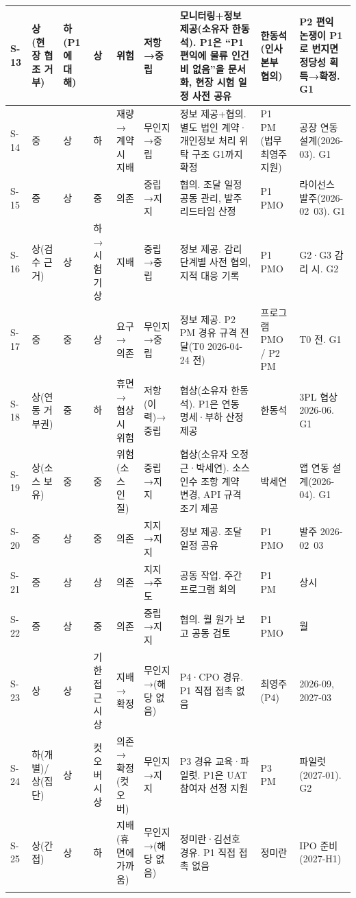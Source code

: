 \documentclass[10pt,a4paper]{article}
\begin{document}
{\begin{longtable}{|L{9mm}|L{12mm}|L{12mm}|L{12mm}|L{20mm}|L{24mm}|L{66mm}|L{24mm}|L{66mm}|}
S-13 & 상(현장 협조 거부) & 하(P1에 대해) & 상 & \textbf{위험} & 저항→중립 & 모니터링+정보 제공(소유자 한동석). P1은 “P1 편익에 물류 인건비 없음”을 문서화, 현장 시험 일정 사전 공유 & 한동석 (인사본부 협의) & P2 편익 논쟁이 P1로 번지면 정당성 획득→확정. G1 \\ \hline
S-14 & 중 & 상 & 하 & 재량→계약 시 지배 & 무인지→중립 & 정보 제공+협의. 별도 법인 계약·개인정보 처리 위탁 구조 G1까지 확정 & P1 PM (법무 최영주 지원) & 공장 연동 설계(2026-03). G1 \\ \hline
S-15 & 중 & 상 & 중 & 의존 & 중립→지지 & 협의. 조달 일정 공동 관리, 발주 리드타임 산정 & P1 PMO & 라이선스 발주(2026-02~03). G1 \\ \hline
S-16 & 상(검수 근거) & 상 & 하→시험기 상 & 지배 & 중립→중립 & 정보 제공. 감리 단계별 사전 협의, 지적 대응 기록 & P1 PMO & G2·G3 감리 시. G2 \\ \hline
S-17 & 중 & 중 & 상 & 요구→의존 & 무인지→중립 & 정보 제공. P2 PM 경유 규격 전달(T0 2026-04-24 전) & 프로그램 PMO / P2 PM & T0 전. G1 \\ \hline
S-18 & 상(연동 거부권) & 중 & 하 & 휴면→협상 시 위험 & 저항(이력)→중립 & 협상(소유자 한동석). P1은 연동 명세·부하 산정 제공 & 한동석 & 3PL 협상 2026-06. G1 \\ \hline
S-19 & 상(소스 보유) & 중 & 중 & 위험(소스 인질) & 중립→지지 & 협상(소유자 오정근·박세연). 소스 인수 조항 계약 변경, API 규격 조기 제공 & 박세연 & 앱 연동 설계(2026-04). G1 \\ \hline
S-20 & 중 & 상 & 중 & 의존 & 지지→지지 & 정보 제공. 조달 일정 공유 & P1 PMO & 발주 2026-02~03 \\ \hline
S-21 & 중 & 상 & 상 & 의존 & 지지→주도 & 공동 작업. 주간 프로그램 회의 & P1 PM & 상시 \\ \hline
S-22 & 중 & 상 & 중 & 의존 & 중립→지지 & 협의. 월 원가 보고 공동 검토 & P1 PMO & 월 \\ \hline
S-23 & 상 & 상 & 기한 접근 시 상 & 지배→확정 & 무인지→(해당 없음) & P4·CPO 경유. P1 직접 접촉 없음 & 최영주 (P4) & 2026-09, 2027-03 \\ \hline
S-24 & 하(개별)/상(집단) & 상 & 컷오버 시 상 & 의존→확정(컷오버) & 무인지→지지 & P3 경유 교육·파일럿. P1은 UAT 참여자 선정 지원 & P3 PM & 파일럿(2027-01). G2 \\ \hline
S-25 & 상(간접) & 상 & 하 & 지배(휴면에 가까움) & 무인지→(해당 없음) & 정미란·김선호 경유. P1 직접 접촉 없음 & 정미란 & IPO 준비(2027-H1) \\ \hline
\fi
\end{longtable}}
\end{document}
